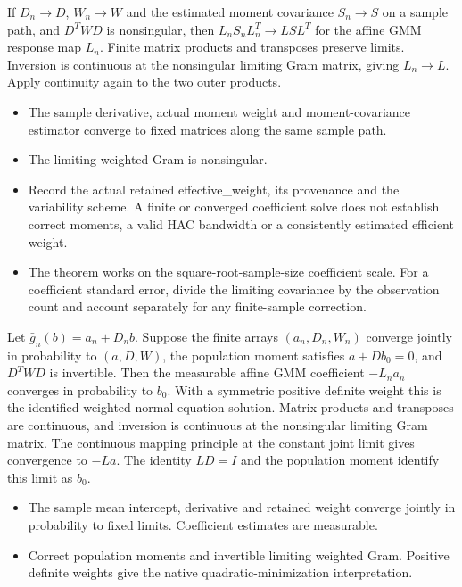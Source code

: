 \expandafter\def\csname statadic@statement@STATADIC-GMM-005\endcsname{If $D_n\to D$, $W_n\to W$ and the estimated moment covariance
  $S_n\to S$ on a sample path, and $D^TWD$ is nonsingular, then
  $L_nS_nL_n^T\to LSL^T$ for the affine GMM response map $L_n$.}
\expandafter\def\csname statadic@proof@STATADIC-GMM-005\endcsname{Finite matrix products and transposes preserve limits. Inversion
  is continuous at the nonsingular limiting Gram matrix, giving $L_n\to L$.
  Apply continuity again to the two outer products.}
\expandafter\def\csname statadic@assumptions@STATADIC-GMM-005\endcsname{\begin{itemize}
\item The sample derivative, actual moment weight and moment-covariance estimator converge to fixed matrices along the same sample path.
\item The limiting weighted Gram is nonsingular.
\end{itemize}}
\expandafter\def\csname statadic@diagnostics@STATADIC-GMM-005\endcsname{\begin{itemize}
\item Record the actual retained effective\_weight, its provenance and the variability scheme. A finite or converged coefficient solve does not establish correct moments, a valid HAC bandwidth or a consistently estimated efficient weight.
\item The theorem works on the square-root-sample-size coefficient scale. For a coefficient standard error, divide the limiting covariance by the observation count and account separately for any finite-sample correction.
\end{itemize}}
\expandafter\def\csname statadic@statement@STATADIC-GMM-006\endcsname{Let $\bar g_n(b)=a_n+D_n b$. Suppose the finite arrays
  $(a_n,D_n,W_n)$ converge jointly in probability to $(a,D,W)$, the
  population moment satisfies $a+Db_0=0$, and $D^TWD$ is invertible.
  Then the measurable affine GMM coefficient $-L_n a_n$ converges in probability to $b_0$.
  With a symmetric positive definite weight this is the identified weighted normal-equation solution.}
\expandafter\def\csname statadic@proof@STATADIC-GMM-006\endcsname{Matrix products and transposes are continuous, and inversion
  is continuous at the nonsingular limiting Gram matrix. The continuous
  mapping principle at the constant joint limit gives convergence to $-La$.
  The identity $LD=I$ and the population moment identify this limit as $b_0$.}
\expandafter\def\csname statadic@assumptions@STATADIC-GMM-006\endcsname{\begin{itemize}
\item The sample mean intercept, derivative and retained weight converge jointly in probability to fixed limits. Coefficient estimates are measurable.
\item Correct population moments and invertible limiting weighted Gram. Positive definite weights give the native quadratic-minimization interpretation.
\end{itemize}}
